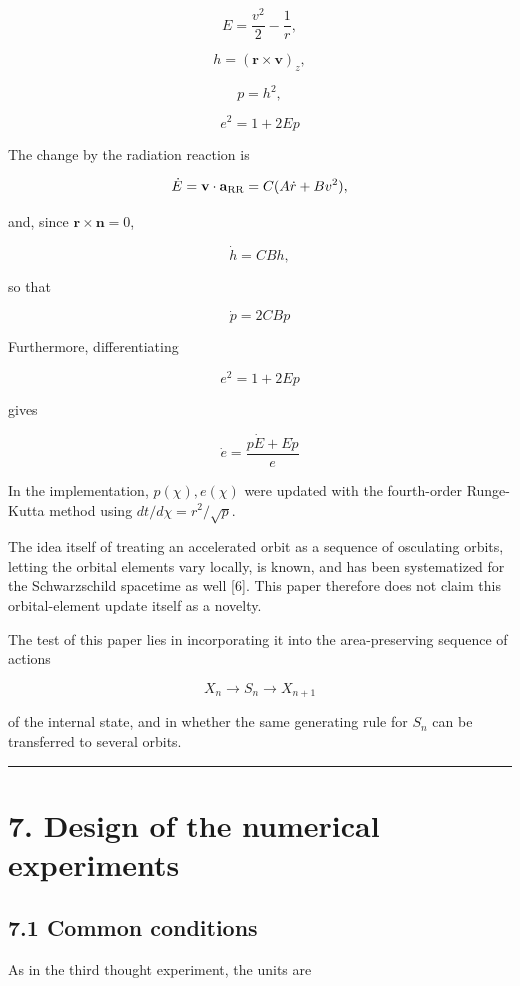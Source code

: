 \documentclass[
  a4paper,
]{article}
\begin{document}
\[
E=\frac{v^2}{2}-\frac1r,
\]

\[
h=(\mathbf r\times\mathbf v)_z,
\]

\[
p=h^2,
\]

\[
e^2=1+2Ep
\]

The change by the radiation reaction is

\[
\dot E
=\mathbf v\cdot\mathbf a_{\rm RR}
=C(A\dot r+Bv^2),
\]

and, since \(\mathbf r\times\mathbf n=0\),

\[
\dot h=CBh,
\]

so that

\[
\boxed{
\dot p=2CBp
}
\]

Furthermore, differentiating

\[
e^2=1+2Ep
\]

gives

\[
\boxed{
\dot e
=\frac{p\dot E+E\dot p}{e}
}
\]

In the implementation, \(p(\chi),e(\chi)\) were updated with the
fourth-order Runge-Kutta method using \(dt/d\chi=r^2/\sqrt p\).

The idea itself of treating an accelerated orbit as a sequence of
osculating orbits, letting the orbital elements vary locally, is known,
and has been systematized for the Schwarzschild spacetime as well
{[}6{]}. This paper therefore does not claim this orbital-element update
itself as a novelty.

The test of this paper lies in incorporating it into the area-preserving
sequence of actions

\[
X_n\rightarrow S_n\rightarrow X_{n+1}
\]

of the internal state, and in whether the same generating rule for
\(S_n\) can be transferred to several orbits.

\begin{center}\rule{0.5\linewidth}{0.5pt}\end{center}

\section{7. Design of the numerical
experiments}\label{design-of-the-numerical-experiments}

\subsection{7.1 Common conditions}\label{common-conditions}

As in the third thought experiment, the units are
\end{document}
